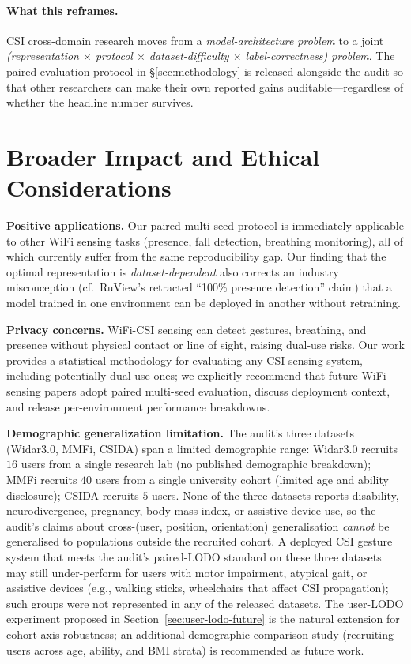 \documentclass[11pt]{article}
\theoremstyle{definition}
\begin{document}
\paragraph{What this reframes.} CSI cross-domain research moves from a \emph{model-architecture problem} to a joint \emph{(representation $\times$ protocol $\times$ dataset-difficulty $\times$ label-correctness) problem}. The paired evaluation protocol in \S\ref{sec:methodology} is released alongside the audit so that other researchers can make their own reported gains auditable---regardless of whether the headline number survives.

\section{Broader Impact and Ethical Considerations}
\label{sec:broader}

\textbf{Positive applications.} Our paired multi-seed protocol is immediately applicable to other WiFi sensing tasks (presence, fall detection, breathing monitoring), all of which currently suffer from the same reproducibility gap. Our finding that the optimal representation is \emph{dataset-dependent} also corrects an industry misconception (cf.\ RuView's retracted ``100\% presence detection'' claim) that a model trained in one environment can be deployed in another without retraining.

\textbf{Privacy concerns.} WiFi-CSI sensing can detect gestures, breathing, and presence without physical contact or line of sight, raising dual-use risks. Our work provides a statistical methodology for evaluating any CSI sensing system, including potentially dual-use ones; we explicitly recommend that future WiFi sensing papers adopt paired multi-seed evaluation, discuss deployment context, and release per-environment performance breakdowns.

\textbf{Demographic generalization limitation.} The audit's three datasets (Widar3.0, MMFi, CSIDA) span a limited demographic range: Widar3.0 recruits $16$ users from a single research lab (no published demographic breakdown); MMFi recruits $40$ users from a single university cohort (limited age and ability disclosure); CSIDA recruits $5$ users. None of the three datasets reports disability, neurodivergence, pregnancy, body-mass index, or assistive-device use, so the audit's claims about cross-(user, position, orientation) generalisation \emph{cannot} be generalised to populations outside the recruited cohort. A deployed CSI gesture system that meets the audit's paired-LODO standard on these three datasets may still under-perform for users with motor impairment, atypical gait, or assistive devices (e.g., walking sticks, wheelchairs that affect CSI propagation); such groups were not represented in any of the released datasets. The user-LODO experiment proposed in Section~\ref{sec:user-lodo-future} is the natural extension for cohort-axis robustness; an additional demographic-comparison study (recruiting users across age, ability, and BMI strata) is recommended as future work.
\end{document}
